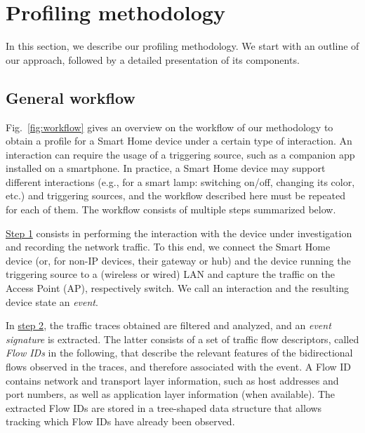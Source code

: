 \section{Profiling methodology}
\label{sec:framework}

In this section, we describe our profiling methodology. We start with an outline of our approach, followed by a detailed presentation of its components.

\subsection{General workflow}
\label{sec:overview}

Fig.~\ref{fig:workflow} gives an overview on the workflow of our methodology to obtain a profile for a Smart Home device under a certain type of interaction. An interaction can require the usage of a triggering source, such as a companion app installed on a smartphone. In practice, a Smart Home device may support different interactions (e.g., for a smart lamp: switching on/off, changing its color, etc.) and triggering sources, and the workflow described here must be repeated for each of them. The workflow consists of multiple steps summarized below.




\hyperref[sec:traffic-capture]{Step 1} consists in performing the interaction with the device under investigation and recording the  network traffic. To this end, we connect the Smart Home device (or, for non-IP devices, their gateway or hub) and the device running the triggering source to a (wireless or wired) LAN and capture the traffic on the Access Point (AP), respectively switch. We call an interaction and the resulting device state an \emph{event}. 

In \hyperref[sec:sig-ex]{step 2}, the traffic traces obtained are filtered and analyzed, and an \emph{event signature} is extracted. The latter consists of a set of traffic flow descriptors, called \emph{Flow IDs} in the following, that describe the relevant features of the bidirectional flows observed in the traces, and therefore associated with the event. A Flow ID contains network and transport layer information, such as host addresses and port numbers, as well as application layer information (when available). The extracted Flow IDs are stored in a tree-shaped data structure that allows tracking which Flow IDs have already been observed.

